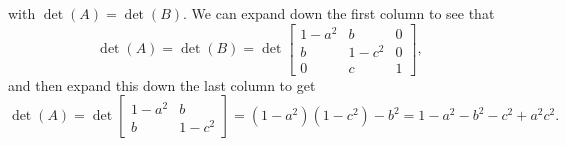 \documentclass{amsart}
\renewcommand{\:}       {\colon}
\begin{document}
\begin{enumerate}
\[  \]
  with $\det(A)=\det(B)$.  We can expand down the first column to see
  that
  \[ \det(A)=\det(B)=\det\left[\begin{array}{ccc} 
      1-a^2 & b     & 0 \\
      b     & 1-c^2 & 0 \\
      0     & c     & 1
     \end{array}\right],
  \]
  and then expand this down the last column to get
  \[ \det(A) =
      \det\left[\begin{array}{cc}
       1-a^2 & b \\ b & 1-c^2
      \end{array}\right] =
      (1-a^2)(1-c^2)-b^2 = 1-a^2-b^2-c^2+a^2c^2.
  \]

\end{enumerate} 
\end{document}
